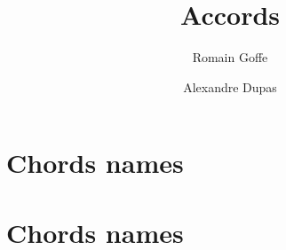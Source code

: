 \documentclass{article}
\title{Accords}
\author{Romain Goffe \and Alexandre Dupas}
\date{}
\begin{document}
\maketitle
\begin{songs}{}
\section{Chords names}
\section{Chords names}
\end{songs}
\end{document}
